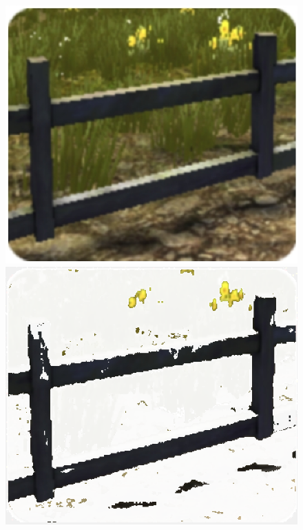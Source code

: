 \begin{enumerate}
\begin{figure}[H]
\begin{minipage}{0.47\textwidth}
  \includegraphics[width=1.0\linewidth]{src/test1.png}
\end{minipage}%
\begin{minipage}{0.47\textwidth}
  \includegraphics[width=1.0\linewidth]{src/ans1.png}
\end{minipage}
\end{figure}


\end{enumerate}
